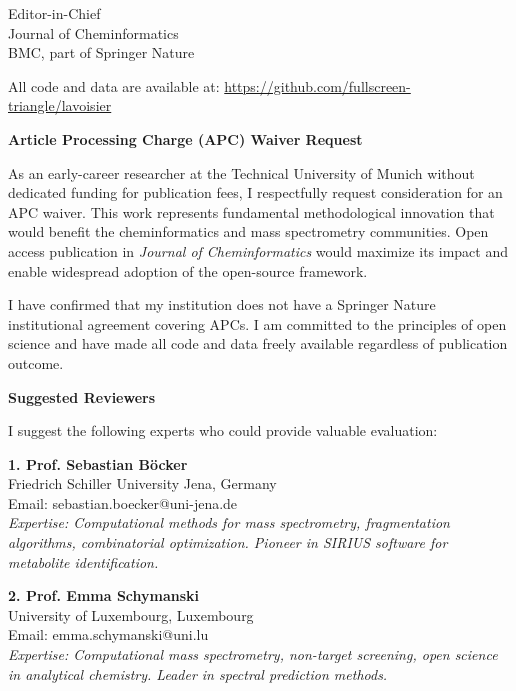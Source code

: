 \documentclass[11pt,letterpaper]{letter}
\begin{document}
\begin{letter}{
    Editor-in-Chief \\
    Journal of Cheminformatics \\
    BMC, part of Springer Nature
}
\vspace{0.2cm}

All code and data are available at: \url{https://github.com/fullscreen-triangle/lavoisier}

\vspace{0.3cm}

\textbf{Article Processing Charge (APC) Waiver Request}

\vspace{0.2cm}

As an early-career researcher at the Technical University of Munich without dedicated funding for publication fees, I respectfully request consideration for an APC waiver. This work represents fundamental methodological innovation that would benefit the cheminformatics and mass spectrometry communities. Open access publication in \textit{Journal of Cheminformatics} would maximize its impact and enable widespread adoption of the open-source framework.

\vspace{0.2cm}

I have confirmed that my institution does not have a Springer Nature institutional agreement covering APCs. I am committed to the principles of open science and have made all code and data freely available regardless of publication outcome.

\vspace{0.3cm}

\textbf{Suggested Reviewers}

\vspace{0.2cm}

I suggest the following experts who could provide valuable evaluation:

\vspace{0.2cm}

\textbf{1. Prof. Sebastian Böcker} \\
Friedrich Schiller University Jena, Germany \\
Email: sebastian.boecker@uni-jena.de \\
\textit{Expertise: Computational methods for mass spectrometry, fragmentation algorithms, combinatorial optimization. Pioneer in SIRIUS software for metabolite identification.}

\vspace{0.2cm}

\textbf{2. Prof. Emma Schymanski} \\
University of Luxembourg, Luxembourg \\
Email: emma.schymanski@uni.lu \\
\textit{Expertise: Computational mass spectrometry, non-target screening, open science in analytical chemistry. Leader in spectral prediction methods.}


\end{letter}
\end{document}
